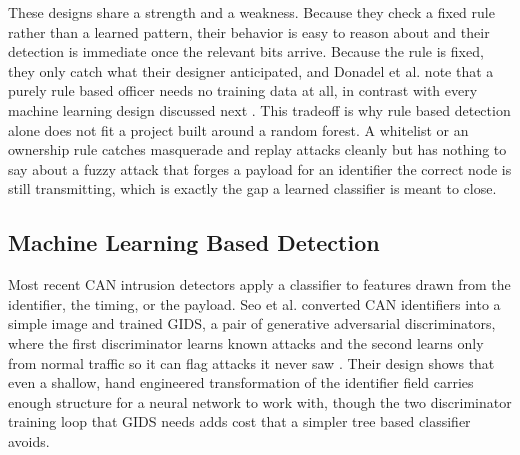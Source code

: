 \documentclass[11pt]{article}
\begin{document}
These designs share a strength and a weakness. Because they check a fixed rule rather than a learned pattern, their behavior is easy to reason about and their detection is immediate once the relevant bits arrive. Because the rule is fixed, they only catch what their designer anticipated, and Donadel et al. note that a purely rule based officer needs no training data at all, in contrast with every machine learning design discussed next \cite{donadel2025}. This tradeoff is why rule based detection alone does not fit a project built around a random forest. A whitelist or an ownership rule catches masquerade and replay attacks cleanly but has nothing to say about a fuzzy attack that forges a payload for an identifier the correct node is still transmitting, which is exactly the gap a learned classifier is meant to close.

\subsection{Machine Learning Based Detection}

Most recent CAN intrusion detectors apply a classifier to features drawn from the identifier, the timing, or the payload. Seo et al. converted CAN identifiers into a simple image and trained GIDS, a pair of generative adversarial discriminators, where the first discriminator learns known attacks and the second learns only from normal traffic so it can flag attacks it never saw \cite{seo2018}. Their design shows that even a shallow, hand engineered transformation of the identifier field carries enough structure for a neural network to work with, though the two discriminator training loop that GIDS needs adds cost that a simpler tree based classifier avoids.
\end{document}
